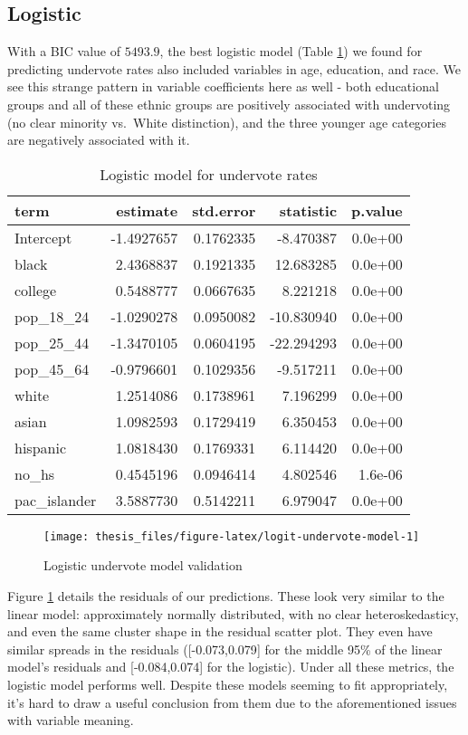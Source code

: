 \documentclass[12pt,twoside]{reedthesis}
\begin{document}
\hypertarget{logistic-2}{%
\subsection{Logistic}\label{logistic-2}}

With a BIC value of \(5493.9\), the best logistic model (Table \ref{tab:logit-undervote-model}) we found for predicting undervote rates also included variables in age, education, and race. We see this strange pattern in variable coefficients here as well - both educational groups and all of these ethnic groups are positively associated with undervoting (no clear minority vs.~White distinction), and the three younger age categories are negatively associated with it.
\begin{table}[t]

\caption[Logit undervote model]{\label{tab:logit-undervote-model}Logistic model for undervote rates}
\centering
\begin{tabular}{lrrrr}
\toprule
term & estimate & std.error & statistic & p.value\\
\midrule
Intercept & -1.4927657 & 0.1762335 & -8.470387 & 0.0e+00\\
black & 2.4368837 & 0.1921335 & 12.683285 & 0.0e+00\\
college & 0.5488777 & 0.0667635 & 8.221218 & 0.0e+00\\
pop\_18\_24 & -1.0290278 & 0.0950082 & -10.830940 & 0.0e+00\\
pop\_25\_44 & -1.3470105 & 0.0604195 & -22.294293 & 0.0e+00\\
\addlinespace
pop\_45\_64 & -0.9796601 & 0.1029356 & -9.517211 & 0.0e+00\\
white & 1.2514086 & 0.1738961 & 7.196299 & 0.0e+00\\
asian & 1.0982593 & 0.1729419 & 6.350453 & 0.0e+00\\
hispanic & 1.0818430 & 0.1769331 & 6.114420 & 0.0e+00\\
no\_hs & 0.4545196 & 0.0946414 & 4.802546 & 1.6e-06\\
\addlinespace
pac\_islander & 3.5887730 & 0.5142211 & 6.979047 & 0.0e+00\\
\bottomrule
\end{tabular}
\end{table}
\begin{figure}
\texttt{[image: thesis\_files/figure-latex/logit-undervote-model-1]} \caption{Logistic undervote model validation}\label{fig:logit-undervote-model}
\end{figure}
Figure \ref{fig:logit-undervote-model} details the residuals of our predictions. These look very similar to the linear model: approximately normally distributed, with no clear heteroskedasticy, and even the same cluster shape in the residual scatter plot. They even have similar spreads in the residuals ({[}-0.073,0.079{]} for the middle 95\% of the linear model's residuals and {[}-0.084,0.074{]} for the logistic). Under all these metrics, the logistic model performs well. Despite these models seeming to fit appropriately, it's hard to draw a useful conclusion from them due to the aforementioned issues with variable meaning.
\end{document}
